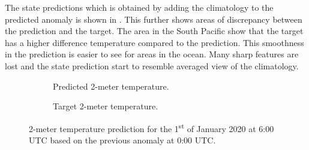 The state predictions which is obtained by adding the climatology to the predicted anomaly is shown in . This further shows areas of discrepancy between the prediction and the target. The area in the South Pacific show that the target has a higher difference temperature compared to the prediction. This smoothness in the prediction is easier to see for areas in the ocean. Many sharp features are lost and the state prediction start to resemble averaged view of the climatology.
\begin{figure}[H]
  \centering
  \begin{subfigure}{\linewidth}
    \begin{adjustbox}{width=\linewidth}
      
    \end{adjustbox}
    \caption{Predicted 2-meter temperature.}\label{fig:sc3_state_pred}
  \end{subfigure}
  \begin{subfigure}{\linewidth}
    \begin{adjustbox}{width=\linewidth}
      
    \end{adjustbox}
    \caption{Target 2-meter temperature.}\label{fig:sc3_state_target}
  \end{subfigure}
  \caption{2-meter temperature prediction for the 1\textsuperscript{st} of January 2020 at 6:00 UTC based on the previous anomaly at 0:00 UTC.}\label{fig:sc3_state_predictions}
\end{figure}

